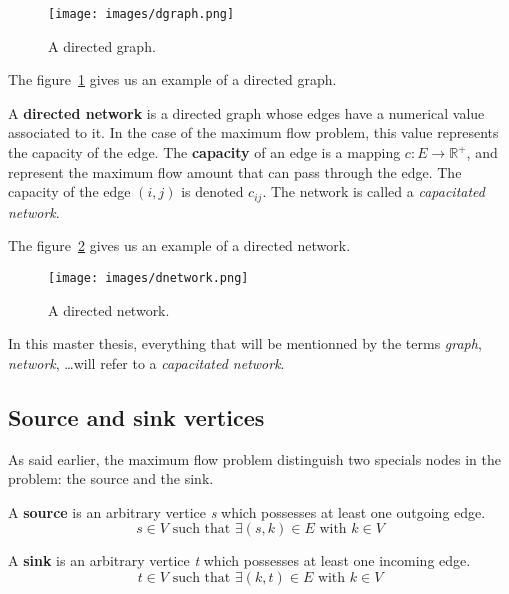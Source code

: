 \begin{figure}
\centering
\texttt{[image: images/dgraph.png]}
\caption{A directed graph.}
\label{img:dgraph}
\end{figure}

The figure~\ref{img:dgraph} gives us an example of a directed graph.

\begin{definition}
\label{dnetwork}
A \textbf{directed network} is a directed graph whose edges have a numerical value associated to it. In the case of the maximum flow problem, this value represents the capacity of the edge. The \textbf{capacity} of an edge is a mapping $c: E \to \mathbb{R}^{+}$, and represent the maximum flow amount that can pass through the edge. The capacity of the edge $(i, j)$ is denoted $c_{ij}$. The network is called a \textit{capacitated network}.
\end{definition}

The figure~\ref{img:dnetwork} gives us an example of a directed network. \\

\begin{figure}
\centering
\texttt{[image: images/dnetwork.png]}
\caption{A directed network.}
\label{img:dnetwork}
\end{figure}



In this master thesis, everything that will be mentionned by the terms \textit{graph}, \textit{network}, \dots will refer to a \textit{capacitated network}.

\subsection{Source and sink vertices}
As said earlier, the maximum flow problem distinguish two specials nodes in the problem: the source and the sink.

\begin{definition}
\label{source}
A \textbf{source} is an arbitrary vertice \textit{s} which possesses at least one outgoing edge.
$$s \in V \text{ such that } \exists (s, k) \in E \text{ with } k \in V$$
\end{definition}

\begin{definition}
\label{sink}
A \textbf{sink} is an arbitrary vertice \textit{t} which possesses at least one incoming edge. 
$$t \in V \text{ such that } \exists (k, t) \in E \text{ with } k \in V$$
\end{definition}

